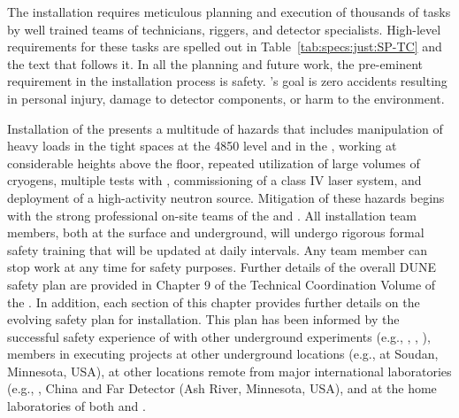 The installation requires meticulous planning and execution of thousands of tasks by well trained teams of technicians, riggers, and detector specialists. 
High-level requirements for these tasks are spelled out in Table~\ref{tab:specs:just:SP-TC} and the text that follows it. 
In all the planning and future work, the pre-eminent requirement %
in the installation process is safety. 's goal is zero accidents resulting in personal injury, damage to detector components, or harm to the environment.


Installation of the %
 presents a multitude of hazards that includes  manipulation of heavy loads in the tight spaces %
at the 4850 level and in the ,  working at considerable heights above the floor, repeated utilization of large volumes of cryogens, multiple tests with , commissioning of a class IV laser system,
 and deployment of a high-activity neutron source. Mitigation of these hazards begins with the strong professional on-site  teams of the  and . %
All installation team members, both at the surface and underground, will undergo rigorous formal safety training that will be updated at daily intervals. Any team member can stop work at any time for safety purposes. Further details of the overall DUNE safety plan are provided in Chapter 9  of the Technical Coordination Volume  of the . In addition, each section of this chapter provides further details on the evolving safety plan for installation. This plan has been informed by the successful safety experience of  with other underground experiments (e.g., , , ),  members in executing projects at other underground locations (e.g.,  at Soudan, Minnesota, USA), at other locations remote from major international laboratories (e.g., , China and  Far Detector (Ash River, Minnesota, USA), and at the home laboratories of both  and .

